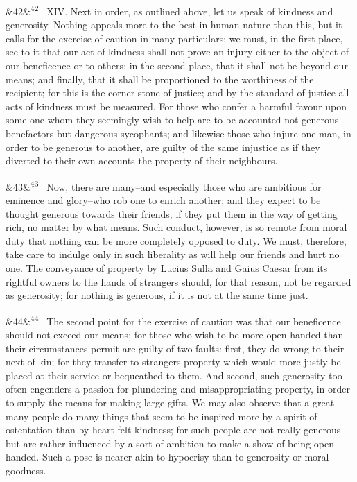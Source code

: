 \documentclass[12pt]{article}
\newcommand{\para}[1][]{\par\noindent\ifx&#1&\else\textsuperscript{\footnotesize #1}~\fi}
\begin{document}
\para[42] XIV. Next in order, as outlined above, let us speak of kindness and generosity. Nothing appeals more to the best in human nature than this, but it calls for the exercise of caution in many particulars: we must, in the first place, see to it that our act of kindness shall not prove an injury either to the object of our beneficence or to others; in the second place, that it shall not be beyond our means; and finally, that it shall be proportioned to the worthiness of the recipient; for this is the corner-stone of justice; and by the standard of justice all acts of kindness must be measured. For those who confer a harmful favour upon some one whom they seemingly wish to help are to be accounted not generous benefactors but dangerous sycophants; and likewise those who injure one man, in order to be generous to another, are guilty of the same injustice as if they diverted to their own accounts the property of their neighbours.

\para[43] Now, there are many--and especially those who are ambitious for eminence and glory--who rob one to enrich another; and they expect to be thought generous towards their friends, if they put them in the way of getting rich, no matter by what means. Such conduct, however, is so remote from moral duty that nothing can be more completely opposed to duty. We must, therefore, take care to indulge only in such liberality as will help our friends and hurt no one. The conveyance of property by Lucius Sulla and Gaius Caesar from its rightful owners to the hands of strangers should, for that reason, not be regarded as generosity; for nothing is generous, if it is not at the same time just.

\para[44] The second point for the exercise of caution was that our beneficence should not exceed our means; for those who wish to be more open-handed than their circumstances permit are guilty of two faults: first, they do wrong to their next of kin; for they transfer to strangers property which would more justly be placed at their service or bequeathed to them. And second, such generosity too often engenders a passion for plundering and misappropriating property, in order to supply the means for making large gifts. We may also observe that a great many people do many things that seem to be inspired more by a spirit of ostentation than by heart-felt kindness; for such people are not really generous but are rather influenced by a sort of ambition to make a show of being open-handed. Such a pose is nearer akin to hypocrisy than to generosity or moral goodness.
\end{document}
